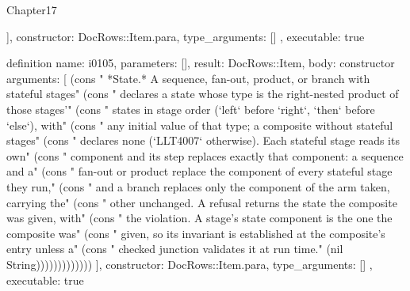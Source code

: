\begin{lexlean}{Chapter17}
\begin{semanticmodule}
{{    ],
    constructor: DocRows::Item.para,
    type_arguments: []
  },
  executable: true
}

definition{
  name: i0105,
  parameters: [],
  result: DocRows::Item,
  body: constructor{
    arguments: [
      (cons "   *State.* A sequence, fan-out, product, or branch with stateful stages" (cons "   declares a state whose type is the right-nested product of those stages'" (cons "   states in stage order (`left` before `right`, `then` before `else`), with" (cons "   any initial value of that type; a composite without stateful stages" (cons "   declares none (`LLT4007` otherwise). Each stateful stage reads its own" (cons "   component and its step replaces exactly that component: a sequence and a" (cons "   fan-out or product replace the component of every stateful stage they run," (cons "   and a branch replaces only the component of the arm taken, carrying the" (cons "   other unchanged. A refusal returns the state the composite was given, with" (cons "   the violation. A stage's state component is the one the composite was" (cons "   given, so its invariant is established at the composite's entry unless a" (cons "   checked junction validates it at run time." (nil String)))))))))))))
    ],
    constructor: DocRows::Item.para,
    type_arguments: []
  },
  executable: true
}


\end{semanticmodule}
\end{lexlean}
